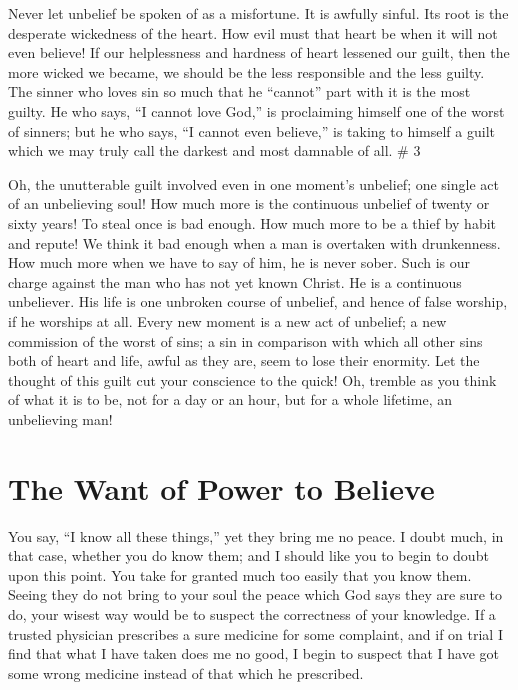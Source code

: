 \documentclass[
]{book}
\begin{document}
Never let unbelief be spoken of as a misfortune. It is awfully sinful. Its root is the desperate wickedness of the heart. How evil must that heart be when it will not even believe! If our helplessness and hardness of heart lessened our guilt, then the more wicked we became, we should be the less responsible and the less guilty. The sinner who loves sin so much that he ``cannot'' part with it is the most guilty. He who says, ``I cannot love God,'' is proclaiming himself one of the worst of sinners; but he who says, ``I cannot even believe,'' is taking to himself a guilt which we may truly call the darkest and most damnable of all.
\# 3

Oh, the unutterable guilt involved even in one moment's unbelief; one single act of an unbelieving soul! How much more is the continuous unbelief of twenty or sixty years! To steal once is bad enough. How much more to be a thief by habit and repute! We think it bad enough when a man is overtaken with drunkenness. How much more when we have to say of him, he is never sober. Such is our charge against the man who has not yet known Christ. He is a continuous unbeliever. His life is one unbroken course of unbelief, and hence of false worship, if he worships at all. Every new moment is a new act of unbelief; a new commission of the worst of sins; a sin in comparison with which all other sins both of heart and life, awful as they are, seem to lose their enormity. Let the thought of this guilt cut your conscience to the quick! Oh, tremble as you think of what it is to be, not for a day or an hour, but for a whole lifetime, an unbelieving man!

\hypertarget{the-want-of-power-to-believe}{%
\chapter{The Want of Power to Believe}\label{the-want-of-power-to-believe}}

You say, ``I know all these things,'' yet they bring me no peace. I doubt much, in that case, whether you do know them; and I should like you to begin to doubt upon this point. You take for granted much too easily that you know them. Seeing they do not bring to your soul the peace which God says they are sure to do, your wisest way would be to suspect the correctness of your knowledge. If a trusted physician prescribes a sure medicine for some complaint, and if on trial I find that what I have taken does me no good, I begin to suspect that I have got some wrong medicine instead of that which he prescribed.
\end{document}
